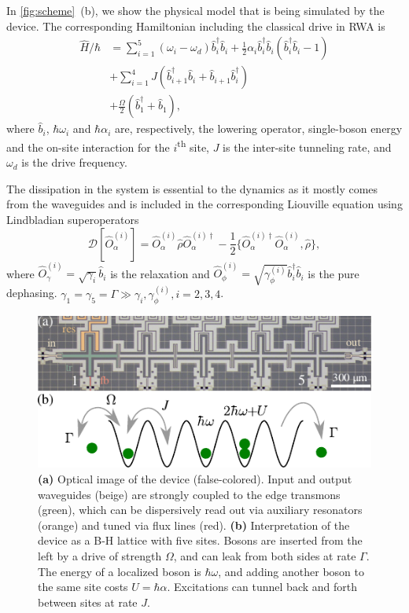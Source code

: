 \documentclass[%
 aps, prl,
 amsmath,amssymb,
 reprint,%
superscriptaddress
]{revtex4-2}
\begin{document}
In \autoref{fig:scheme}~(b), we show the physical model that is being simulated by the device. The corresponding Hamiltonian including the classical drive in RWA is
\begin{equation}
\begin{aligned}
\hat H/\hbar &= \sum_{i=1}^5 (\omega_i - \omega_d) \hat b^\dag_i \hat b_i + \frac{1}{2} \alpha_i \hat b_i^\dag \hat b_i (\hat b^\dag_i \hat b_i - 1)\\
&+\sum_{i=1}^4 J (\hat b^\dag_{i+1} \hat b_i + \hat b_{i+1} \hat b_i^\dag) \\
&+\frac{\Omega}{2}(\hat b_1^\dag + \hat b_1),
\end{aligned}\label{eq:bose-hubbard}
\end{equation} 
where $\hat b_i$, $\hbar \omega_i$ and $\hbar\alpha_i$ are, respectively, the lowering operator, single-boson energy and the on-site interaction for the $i$\textsuperscript{th} site, $J$ is the inter-site tunneling rate, and $\omega_d$  is the drive frequency.

The dissipation in the system is essential to the dynamics as it mostly comes from the waveguides and is included in the corresponding Liouville equation using Lindbladian superoperators 
\begin{equation}
	\mathcal D[\hat{O}^{(i)}_\alpha] = \hat{O}^{(i)}_\alpha \hat \rho \hat{O}^{(i)\dag}_\alpha - \frac{1}{2}\{\hat{O}^{(i)\dag}_\alpha \hat{O}^{(i)}_\alpha, \hat \rho\},
\end{equation}
where $\hat{O}^{(i)}_\gamma = \sqrt{\gamma_i} \hat b_i$ is the relaxation and $\hat{O}^{(i)}_\phi = \sqrt{\gamma^{(i)}_\phi} \hat b_i^\dag \hat b_i$ is the pure dephasing. $\gamma_1 = \gamma_5 = \Gamma \gg \gamma_i, \gamma_\phi^{(i)}, i=2,3,4$.


\begin{figure}
	\centering
	\includegraphics[width=1\linewidth]{Pictures/scheme.pdf}
	\caption{\textbf{(a)} Optical image of the device (false-colored). Input and output waveguides (beige) are strongly coupled to the edge transmons (green), which can be dispersively read out via auxiliary resonators (orange) and tuned via flux lines (red). \textbf{(b)} Interpretation of the device as a B-H lattice with five sites. Bosons are inserted from the left by a drive of strength $\Omega$, and can leak from both sides at rate $\Gamma$. The energy of a localized boson is $\hbar \omega$, and adding another boson to the same site costs $U = \hbar \alpha$. Excitations can tunnel back and forth between sites at rate $J$.}
	\label{fig:scheme}
\end{figure}
\end{document}
